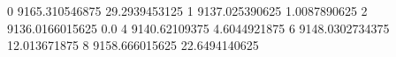 0 9165.310546875 29.2939453125
1 9137.025390625 1.0087890625
2 9136.0166015625 0.0
4 9140.62109375 4.6044921875
6 9148.0302734375 12.013671875
8 9158.666015625 22.6494140625
